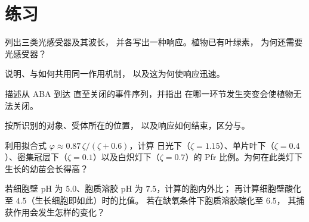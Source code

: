 \section{练习}

\begin{exercise}[$\star$]\label{exo:b3:plant-molecular-physiology:1}
列出三类光感受器及其波长，
并各写出一种响应。植物已有叶绿素，
为何还需要光感受器？
\end{exercise}

\begin{exercise}[$\star$]\label{exo:b3:plant-molecular-physiology:2}
说明、与如何共用同一作用机制，
以及这为何使响应迅速。
\end{exercise}

\begin{exercise}[$\star$]\label{exo:b3:plant-molecular-physiology:3}
描述从 ABA 到达
直至关闭的事件序列，并指出
在哪一环节发生突变会使植物无法关闭。
\end{exercise}

\begin{exercise}[$\star$]\label{exo:b3:plant-molecular-physiology:4}
按所识别的对象、受体所在的位置，
以及响应如何结束，区分与。
\end{exercise}

\begin{exercise}[$\star\star$]\label{exo:b3:plant-molecular-physiology:5}
利用拟合式 $\varphi \approx 0.87\,\zeta/(\zeta + 0.6)$，计算
日光下（$\zeta = 1.15$）、单片叶下（$\zeta =
0.4$）、密集冠层下（$\zeta = 0.1$）以及白炽灯下（$\zeta = 0.7$）的
Pfr 比例。为何在此类灯下生长的幼苗会长得高？
\end{exercise}

\begin{exercise}[$\star\star$]\label{exo:b3:plant-molecular-physiology:6}
若细胞壁 pH 为 $5.0$、胞质溶胶 pH 为 $7.5$，计算的胞内外比；
再计算细胞壁酸化至 $4.5$（生长细胞即如此）时的比值。
若在缺氧条件下胞质溶胶酸化至 $6.5$，
其捕获作用会发生怎样的变化？
\end{exercise}

